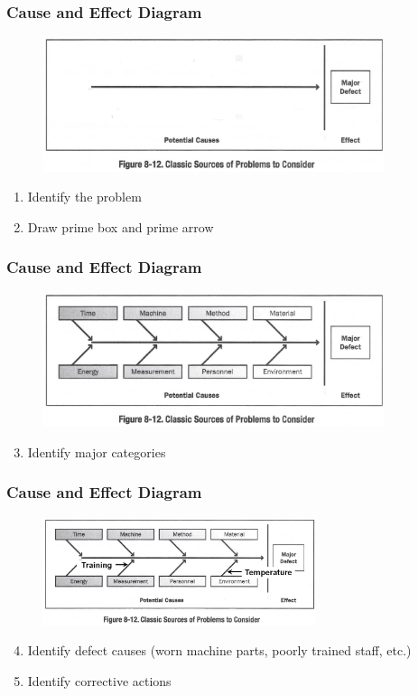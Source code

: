 \begin{frame}
\frametitle{Cause and Effect Diagram}
\begin{figure}
	\centering
		\includegraphics[width = 10cm]{images/ish3.jpg}
	\label{fig:ish3}
\end{figure}
\begin{enumerate}
	\item Identify the problem
	\item Draw prime box and prime arrow
\end{enumerate}
\end{frame}




\begin{frame}
\frametitle{Cause and Effect Diagram}
\begin{figure}
	\centering
		\includegraphics[width = 10cm]{images/ish2.jpg}
	\label{fig:ish2}
\end{figure}
\begin{enumerate}
  \setcounter{enumi}{2}
  \item Identify major categories
\end{enumerate}


\end{frame}




\begin{frame}
\frametitle{Cause and Effect Diagram}
\begin{figure}
	\centering
		\includegraphics[width = 8cm]{images/ish1.jpg}
	\label{fig:ish1}
\end{figure}

\begin{enumerate}
  \setcounter{enumi}{3}
  \item Identify defect causes (worn machine parts, poorly trained staff, etc.)
  \item Identify corrective actions
\end{enumerate}

\end{frame}





